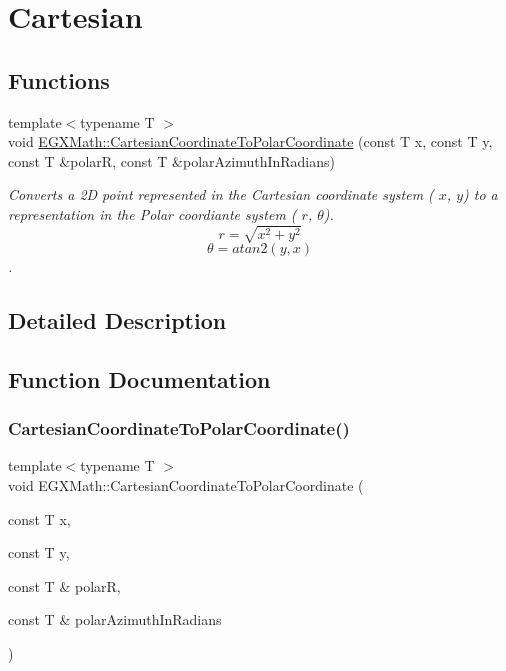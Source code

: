 \hypertarget{group___e_g_x_math-_conversions-_coordinate_conversions-2_d-_cartesian}{}\section{Cartesian}
\label{group___e_g_x_math-_conversions-_coordinate_conversions-2_d-_cartesian}
\subsection*{Functions}
\begin{DoxyCompactItemize}
\item 
{\footnotesize template$<$typename T $>$ }\\void \mbox{\hyperlink{group___e_g_x_math-_conversions-_coordinate_conversions-2_d-_cartesian_ga01ead70b7b75d7ad0f80776c8c254897}{E\+G\+X\+Math\+::\+Cartesian\+Coordinate\+To\+Polar\+Coordinate}} (const T x, const T y, const T \&polarR, const T \&polar\+Azimuth\+In\+Radians)
\begin{DoxyCompactList}\small\item\em Converts a 2D point represented in the Cartesian coordinate system ( $x$, $y$) to a representation in the Polar coordiante system ( $r$, $\theta$). \[ r = \sqrt{x^2+y^2} \] \[ \theta = atan2(y,x) \]. \end{DoxyCompactList}\end{DoxyCompactItemize}


\subsection{Detailed Description}


\subsection{Function Documentation}
\mbox{\label{group___e_g_x_math-_conversions-_coordinate_conversions-2_d-_cartesian_ga01ead70b7b75d7ad0f80776c8c254897}} 
\subsubsection{\texorpdfstring{Cartesian\+Coordinate\+To\+Polar\+Coordinate()}{CartesianCoordinateToPolarCoordinate()}}
{\footnotesize\ttfamily template$<$typename T $>$ \\
void E\+G\+X\+Math\+::\+Cartesian\+Coordinate\+To\+Polar\+Coordinate (\begin{DoxyParamCaption}\item[{const T}]{x,  }\item[{const T}]{y,  }\item[{const T \&}]{polarR,  }\item[{const T \&}]{polar\+Azimuth\+In\+Radians }\end{DoxyParamCaption})}



